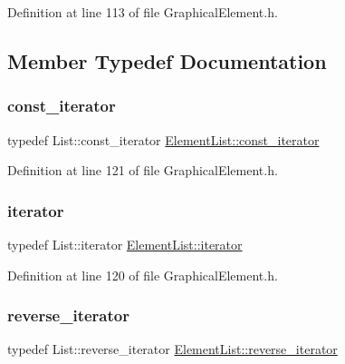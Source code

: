 Definition at line 113 of file Graphical\+Element.\+h.



\subsection{Member Typedef Documentation}
\mbox{\label{class_element_list_a4323074a8e979322c0bf1eed5c892cf4}} 
\subsubsection{\texorpdfstring{const\+\_\+iterator}{const\_iterator}}
{\footnotesize\ttfamily typedef List\+::const\+\_\+iterator \hyperlink{class_element_list_a4323074a8e979322c0bf1eed5c892cf4}{Element\+List\+::const\+\_\+iterator}}



Definition at line 121 of file Graphical\+Element.\+h.

\mbox{\label{class_element_list_a10e1b0c17ebe441fcd035fcf0a00d25e}} 
\subsubsection{\texorpdfstring{iterator}{iterator}}
{\footnotesize\ttfamily typedef List\+::iterator \hyperlink{class_element_list_a10e1b0c17ebe441fcd035fcf0a00d25e}{Element\+List\+::iterator}}



Definition at line 120 of file Graphical\+Element.\+h.

\mbox{\label{class_element_list_a5a94d1e25a0deeb3f222dc12fa115174}} 
\subsubsection{\texorpdfstring{reverse\+\_\+iterator}{reverse\_iterator}}
{\footnotesize\ttfamily typedef List\+::reverse\+\_\+iterator \hyperlink{class_element_list_a5a94d1e25a0deeb3f222dc12fa115174}{Element\+List\+::reverse\+\_\+iterator}}



